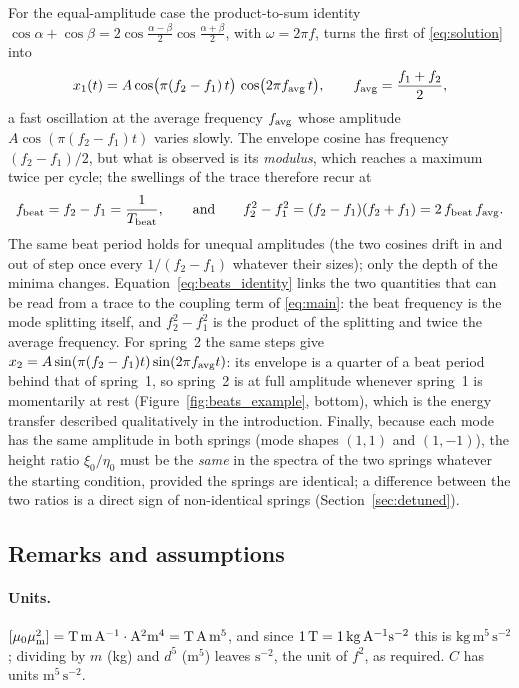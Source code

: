 For the equal-amplitude case the product-to-sum identity $\cos\alpha+\cos\beta=2\cos\frac{\alpha-\beta}{2}\cos\frac{\alpha+\beta}{2}$, with $\omega=2\pi f$, turns the first of \eqref{eq:solution} into
\begin{equation}
x_1(t)=A\cos\!\big(\pi(f_2-f_1)\,t\big)\,\cos\!\big(2\pi f_{\rm avg}\,t\big),\qquad f_{\rm avg}=\frac{f_1+f_2}{2},
\label{eq:beats}
\end{equation}
a fast oscillation at the average frequency $f_{\rm avg}$ whose amplitude $A\cos(\pi(f_2-f_1)t)$ varies slowly. The envelope cosine has frequency $(f_2-f_1)/2$, but what is observed is its \emph{modulus}, which reaches a maximum twice per cycle; the swellings of the trace therefore recur at
\begin{equation}
f_{\rm beat}=f_2-f_1=\frac{1}{T_{\rm beat}},
\qquad\text{and}\qquad
f_2^2-f_1^2=(f_2-f_1)(f_2+f_1)=2\,f_{\rm beat}\,f_{\rm avg}.
\label{eq:beats_identity}
\end{equation}
The same beat period holds for unequal amplitudes (the two cosines drift in and out of step once every $1/(f_2-f_1)$ whatever their sizes); only the depth of the minima changes. Equation~\eqref{eq:beats_identity} links the two quantities that can be read from a trace to the coupling term of \eqref{eq:main}: the beat frequency is the mode splitting itself, and $f_2^2-f_1^2$ is the product of the splitting and twice the average frequency. For spring~2 the same steps give $x_2=A\sin(\pi(f_2-f_1)t)\sin(2\pi f_{\rm avg}t)$: its envelope is a quarter of a beat period behind that of spring~1, so spring~2 is at full amplitude whenever spring~1 is momentarily at rest (Figure~\ref{fig:beats_example}, bottom), which is the energy transfer described qualitatively in the introduction. Finally, because each mode has the same amplitude in both springs (mode shapes $(1,1)$ and $(1,-1)$), the height ratio $\xi_0/\eta_0$ must be the \emph{same} in the spectra of the two springs whatever the starting condition, provided the springs are identical; a difference between the two ratios is a direct sign of non-identical springs (Section~\ref{sec:detuned}).

\subsection{Remarks and assumptions}\label{sec:remarks}

\paragraph{Units.} $[\mu_0\mu_{\mathrm m}^2]=\mathrm{T\,m\,A^{-1}}\cdot\mathrm{A^2m^4}=\mathrm{T\,A\,m^5}$, and since $1\,\mathrm{T}=1\,\mathrm{kg\,A^{-1}s^{-2}}$ this is $\mathrm{kg\,m^5\,s^{-2}}$; dividing by $m$ (kg) and $d^5$ ($\mathrm{m^5}$) leaves $\mathrm{s^{-2}}$, the unit of $f^2$, as required. $C$ has units $\mathrm{m^5\,s^{-2}}$.

